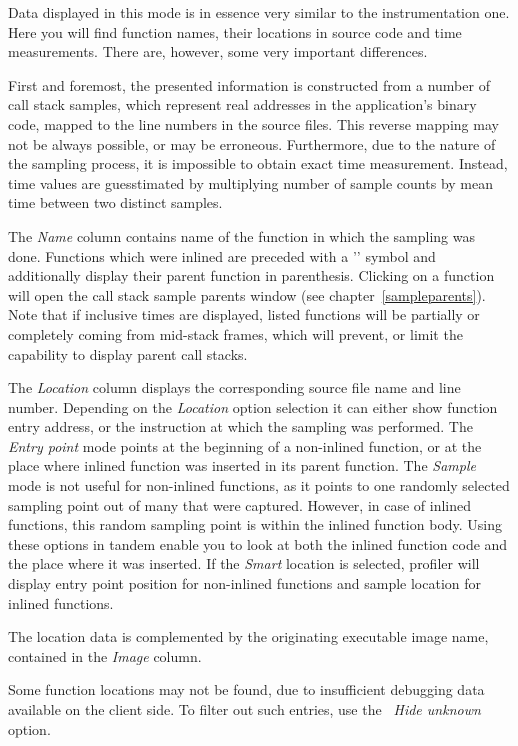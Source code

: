 \documentclass[hidelinks,titlepage,a4paper]{article}
\begin{document}
Data displayed in this mode is in essence very similar to the instrumentation one. Here you will find function names, their locations in source code and time measurements. There are, however, some very important differences.

First and foremost, the presented information is constructed from a number of call stack samples, which represent real addresses in the application's binary code, mapped to the line numbers in the source files. This reverse mapping may not be always possible, or may be erroneous. Furthermore, due to the nature of the sampling process, it is impossible to obtain exact time measurement. Instead, time values are guesstimated by multiplying number of sample counts by mean time between two distinct samples.

The \emph{Name} column contains name of the function in which the sampling was done. Functions which were inlined are preceded with a '\faCaretRight{}' symbol and additionally display their parent function in parenthesis. Clicking on a function will open the call stack sample parents window (see chapter~\ref{sampleparents}). Note that if inclusive times are displayed, listed functions will be partially or completely coming from mid-stack frames, which will prevent, or limit the capability to display parent call stacks.

The \emph{Location} column displays the corresponding source file name and line number. Depending on the \emph{Location} option selection it can either show function entry address, or the instruction at which the sampling was performed. The \emph{Entry point} mode points at the beginning of a non-inlined function, or at the place where inlined function was inserted in its parent function. The \emph{Sample} mode is not useful for non-inlined functions, as it points to one randomly selected sampling point out of many that were captured. However, in case of inlined functions, this random sampling point is within the inlined function body. Using these options in tandem enable you to look at both the inlined function code and the place where it was inserted. If the \emph{Smart} location is selected, profiler will display entry point position for non-inlined functions and sample location for inlined functions.

The location data is complemented by the originating executable image name, contained in the \emph{Image} column.

Some function locations may not be found, due to insufficient debugging data available on the client side. To filter out such entries, use the \emph{\faEyeSlash{}~Hide unknown} option.
\end{document}
